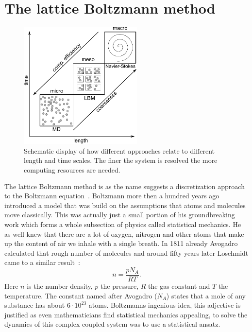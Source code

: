 \section{The lattice Boltzmann method}\label{sec:LBM}
\begin{figure}
    \centering
    \includegraphics[width=0.55\textwidth]{graphics/Scales_problem.pdf}
    \caption{Schematic display of how different approaches relate to different length and time scales.
    The finer the system is resolved the more computing resources are needed.}
    \label{fig:scales_dummy}
\end{figure}
The lattice Boltzmann method is as the name suggests a discretization approach to the Boltzmann equation~\cite{krugerLatticeBoltzmannMethod2017, succiLatticeBoltzmannEquation2001, wolf-gladrowLatticeGasCellularAutomata2004}.
Boltzmann more then a hundred years ago introduced a model that was build on the assumptions that atoms and molecules move classically.
This was actually just a small portion of his groundbreaking work which forms a whole subsection of physics called statistical mechanics. 
He as well knew that there are a lot of oxygen, nitrogen and other atoms that make up the content of air we inhale with a single breath.
In 1811 already Avogadro calculated that rough number of molecules and around fifty years later Loschmidt came to a similar result~\cite{avagadro1811essai, loschmidtZur1866}:
\begin{equation}
    n = \frac{p N_A}{R T}.
\end{equation}
Here $n$ is the number density, $p$ the pressure, $R$ the gas constant and $T$ the temperature.
The constant named after Avogadro ($N_A$) states that a mole of any substance has about $6 \cdot 10^{23}$ atoms.
Boltzmanns ingenious idea, this adjective is justified as even mathematicians find statistical mechanics appealing, to solve the dynamics of this complex coupled system was to use a statistical ansatz.
